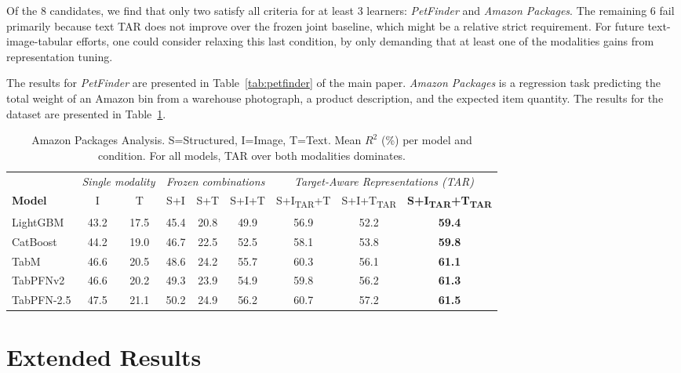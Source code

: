Of the 8 candidates, we find that only two satisfy all criteria for at least 3 learners: \textit{PetFinder} and \textit{Amazon Packages}. The remaining 6 fail primarily because text TAR does not improve over the frozen joint baseline, which might be a relative strict requirement. For future text-image-tabular efforts, one could consider relaxing this last condition, by only demanding that at least one of the modalities gains from representation tuning.

The results for \textit{PetFinder} are presented in Table~\ref{tab:petfinder} of the main paper. \textit{Amazon Packages} is a regression task predicting the total weight of an Amazon bin from a warehouse photograph, a product description, and the expected item quantity. The results for the dataset are presented in Table~\ref{tab:amazon_packages}.

\begin{table}[ht]
\centering
\caption{Amazon Packages Analysis. S=Structured, I=Image, T=Text. Mean $R^2$ (\%) per model and condition. For all models, TAR over both modalities dominates.}
\label{tab:amazon_packages}
\setlength{\tabcolsep}{4pt}
\small
\begin{tabular}{l cc ccc ccc}
\toprule
 & \multicolumn{2}{c}{\textit{Single modality}} & \multicolumn{3}{c}{\textit{Frozen combinations}} & \multicolumn{3}{c}{\textit{Target-Aware Representations (TAR)}} \\
\cmidrule(lr){2-3}\cmidrule(lr){4-6}\cmidrule(lr){7-9}
\textbf{Model} & I & T & S+I & S+T & S+I+T & S+I\textsubscript{TAR}+T & S+I+T\textsubscript{TAR} & \textbf{S+I\textsubscript{TAR}+T\textsubscript{TAR}} \\
\midrule
LightGBM   & 43.2 & 17.5 & 45.4 & 20.8 & 49.9 & 56.9 & 52.2 & \textbf{59.4} \\
CatBoost   & 44.2 & 19.0 & 46.7 & 22.5 & 52.5 & 58.1 & 53.8 & \textbf{59.8} \\
TabM       & 46.6 & 20.5 & 48.6 & 24.2 & 55.7 & 60.3 & 56.1 & \textbf{61.1} \\
TabPFNv2   & 46.6 & 20.2 & 49.3 & 23.9 & 54.9 & 59.8 & 56.2 & \textbf{61.3} \\
TabPFN-2.5 & 47.5 & 21.1 & 50.2 & 24.9 & 56.2 & 60.7 & 57.2 & \textbf{61.5} \\
\bottomrule
\end{tabular}
\end{table}


\section{Extended Results}
\label{app:extended_results}


